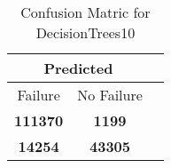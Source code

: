\begin{table}[] 
\caption{Confusion Matric for DecisionTrees10} 
\label{Table: Prediction Accuracy-DMDDecisionTrees10OnlySunEKF-combinationReflectionEKF-top2perfectNoFailurePrediction-Reflection} 
\centering 
\begin{tabular} 
 {@{}ccc@{}} 
\toprule 
\multicolumn{2}{c}{\textbf{Predicted}}
 \\ \midrule 
\multicolumn{1}{|c|}{Failure} & 
\multicolumn{1}{c|}{No Failure}
 \\ \midrule 
\multicolumn{1}{|c|}{\color{green}\textbf{111370}} & 
\multicolumn{1}{c|}{\color{red}\textbf{1199}}
 \\ \midrule 
\multicolumn{1}{|c|}{\color{red}\textbf{14254}} & 
\multicolumn{1}{c|}{\color{green}\textbf{43305}}
 \\ \bottomrule 
\end{tabular} 
\end{table} 
